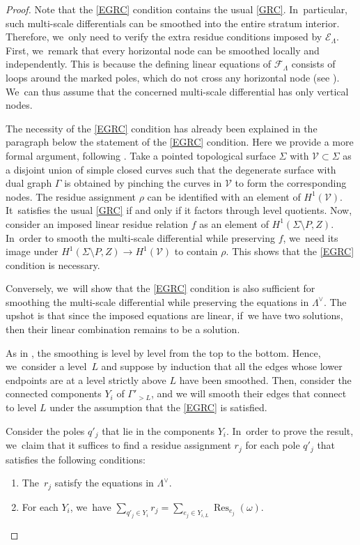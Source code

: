 \documentclass[11pt]{article}
\newenvironment{enumeratea}
{\bgroup\def\theenumi{\alph{enumi}}\begin{enumerate}}
{\end{enumerate}\egroup}
\DeclareMathOperator\Res{Res}
\theoremstyle{definition}
\begin{document}
\begin{proof}
Note that the \ref{EGRC} condition contains the usual \ref{GRC}. In~particular, such multi-scale differentials can be smoothed into the entire stratum interior. Therefore, we~only need to verify the extra residue conditions imposed by $\mathcal{E}_{\Lambda}$. First, we~remark that every horizontal node can be smoothed locally and independently. This is because the defining linear equations of $\mathcal F_{\Lambda}$ consists of loops around the marked poles, which do not cross any horizontal node (see \cite{BDG}). We~can thus assume that the concerned multi-scale differential has only vertical nodes.

The necessity of the \ref{EGRC} condition has already been explained in the paragraph below the statement of the \ref{EGRC} condition. Here we provide a more formal argument,
following \cite[Prop.\,6.3]{BCGGM3}. Take a pointed topological surface $\Sigma$ with $\mathcal{V}\subset \Sigma$ as a disjoint union of simple closed curves such that the degenerate surface with dual graph $\Gamma$ is obtained by
pinching the curves in $\mathcal{V}$ to form the corresponding nodes. The residue assignment $\rho$ can be identified with an element of $H^1(\mathcal{V})$. It~satisfies the usual \ref{GRC} if and only if it factors through level quotients. Now, consider an imposed linear residue relation $f$ as an element of $H^1(\Sigma \setminus P, Z)$. In~order to smooth the multi-scale differential while preserving $f$, we~need its image under $H^1(\Sigma \setminus P, Z) \to H^1(\mathcal{V})$ to contain $\rho$. This shows that the \ref{EGRC} condition is necessary.

Conversely, we~will show that the \ref{EGRC} condition is also sufficient for smoothing the multi-scale differential while preserving the equations in $\Lambda^{\vee}$. The upshot is that since the imposed equations are linear, if~we have two solutions, then their linear combination remains to be a solution.

As in \cite{BCGGM}, the smoothing is level by level from the top to the bottom. Hence, we~consider a level~$L$ and suppose by induction that all the edges whose lower endpoints are at a level strictly above $L$ have been smoothed. Then, consider the connected components $Y_i$ of $\Gamma'_{>L}$, and we will smooth their edges that connect to level $L$ under the assumption that the \ref{EGRC} is satisfied.

Consider the poles $q'_{j}$ that lie in the components $Y_{i}$. In~order to prove the result, we~claim that it suffices to find a residue assignment $r_{j}$ for each pole $q'_{j}$ that satisfies the following conditions:
\begin{enumeratea}
\item\label{enum:a}
The~$r_{j}$ satisfy the equations in $\Lambda^{\vee}$.
\item\label{enum:b}
For each $Y_{i}$, we~have $\sum_{q'_j\in Y_i}r_{j}=\sum_{e_j \in Y_{i, L}} \Res_{e_j} (\omega)$.
\end{enumeratea}


\end{proof}
\end{document}
